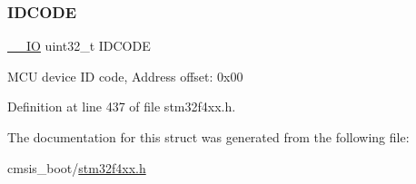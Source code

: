 \subsubsection{\texorpdfstring{I\+D\+C\+O\+DE}{IDCODE}}
{\footnotesize\ttfamily \hyperlink{group___c_m_s_i_s__core__definitions_gaec43007d9998a0a0e01faede4133d6be}{\+\_\+\+\_\+\+IO} uint32\+\_\+t I\+D\+C\+O\+DE}

M\+CU device ID code, Address offset\+: 0x00 

Definition at line 437 of file stm32f4xx.\+h.



The documentation for this struct was generated from the following file\+:\begin{DoxyCompactItemize}
\item 
cmsis\+\_\+boot/\hyperlink{stm32f4xx_8h}{stm32f4xx.\+h}\end{DoxyCompactItemize}
